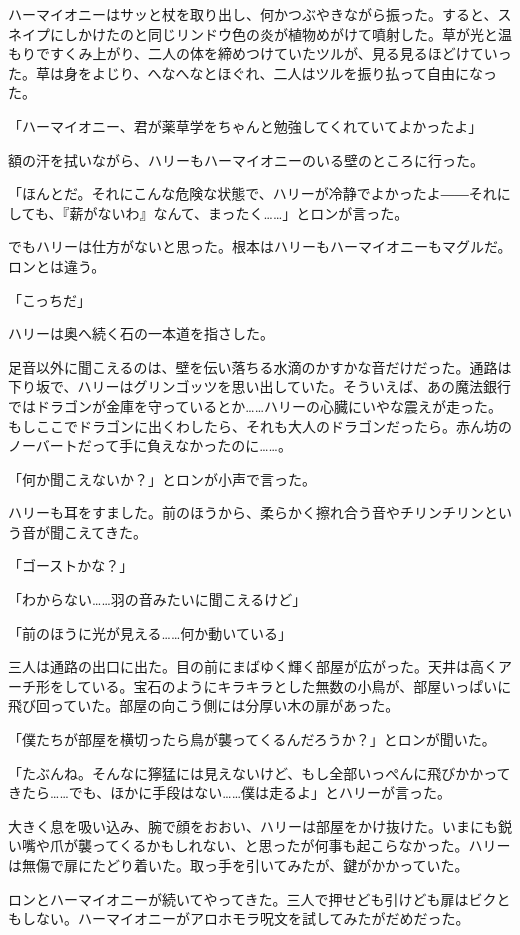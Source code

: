 \documentclass[10pt,a4paper]{article}
\begin{document}
\begin{CJK}{UTF8}{min}
ハーマイオニーはサッと杖を取り出し、何かつぶやきながら振った。すると、スネイプにしかけたのと同じリンドウ色の炎が植物めがけて噴射した。草が光と温もりですくみ上がり、二人の体を締めつけていたツルが、見る見るほどけていった。草は身をよじり、へなへなとほぐれ、二人はツルを振り払って自由になった。

「ハーマイオニー、君が薬草学をちゃんと勉強してくれていてよかったよ」

額の汗を拭いながら、ハリーもハーマイオニーのいる壁のところに行った。

「ほんとだ。それにこんな危険な状態で、ハリーが冷静でよかったよ――それにしても、『薪がないわ』なんて、まったく……」とロンが言った。

でもハリーは仕方がないと思った。根本はハリーもハーマイオニーもマグルだ。ロンとは違う。

「こっちだ」

ハリーは奥へ続く石の一本道を指さした。

足音以外に聞こえるのは、壁を伝い落ちる水滴のかすかな音だけだった。通路は下り坂で、ハリーはグリンゴッツを思い出していた。そういえば、あの魔法銀行ではドラゴンが金庫を守っているとか……ハリーの心臓にいやな震えが走った。もしここでドラゴンに出くわしたら、それも大人のドラゴンだったら。赤ん坊のノーバートだって手に負えなかったのに……。

「何か聞こえないか？」とロンが小声で言った。

ハリーも耳をすました。前のほうから、柔らかく擦れ合う音やチリンチリンという音が聞こえてきた。

「ゴーストかな？」

「わからない……羽の音みたいに聞こえるけど」

「前のほうに光が見える……何か動いている」

三人は通路の出口に出た。目の前にまばゆく輝く部屋が広がった。天井は高くアーチ形をしている。宝石のようにキラキラとした無数の小鳥が、部屋いっぱいに飛び回っていた。部屋の向こう側には分厚い木の扉があった。

「僕たちが部屋を横切ったら鳥が襲ってくるんだろうか？」とロンが聞いた。

「たぶんね。そんなに獰猛には見えないけど、もし全部いっぺんに飛びかかってきたら……でも、ほかに手段はない……僕は走るよ」とハリーが言った。

大きく息を吸い込み、腕で顔をおおい、ハリーは部屋をかけ抜けた。いまにも鋭い嘴や爪が襲ってくるかもしれない、と思ったが何事も起こらなかった。ハリーは無傷で扉にたどり着いた。取っ手を引いてみたが、鍵がかかっていた。

ロンとハーマイオニーが続いてやってきた。三人で押せども引けども扉はビクともしない。ハーマイオニーがアロホモラ呪文を試してみたがだめだった。


\end{CJK}
\end{document}
